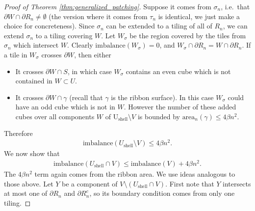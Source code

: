 \documentclass[10pt,a4paper]{amsart}
\begin{document}
\begin{proof}[Proof of Theorem \ref{thm:generalized_patching}]
     Suppose it comes from $\sigma_n$, i.e.\ that $\partial W\cap \partial R_n\neq \emptyset$ (the version where it comes from $\tau_n$ is identical, we just make a choice for concreteness). Since $\sigma_n$ can be extended to a tiling of all of $R_n$, we can extend $\sigma_n$ to a tiling covering $W$. Let $W_\sigma$ be the region covered by the tiles from $\sigma_n$ which intersect $W$. Clearly $\text{imbalance}(W_\sigma)=0$, and $W_\sigma\cap \partial R_n = W\cap \partial R_n$. If a tile in $W_\sigma$ crosses $\partial W$, then either
     \begin{itemize}
         \item It crosses $\partial W \cap S$, in which case $W_\sigma$ contains an even cube which is not contained in $W\subset U$. 
         \item It crosses $\partial W\cap \gamma$ (recall that $\gamma$ is the ribbon surface). In this case $W_\sigma$ could have an odd cube which is not in $W$. However the number of these added cubes over all components $W$ of $\text{U}_{\text{shell}}\setminus V$ is bounded by $\text{area}_n(\gamma) \leq 4\beta n^2$.
     \end{itemize}
    Therefore 
    \begin{align*}
        \text{imbalance}(U_{\text{shell}}\setminus V) \leq 4 \beta n^2. 
    \end{align*}
    We now show that 
    \begin{align*}
        \text{imbalance}(U_{\text{shell}}\cap V) \leq \text{imbalance}(V) + 4\beta n^2. 
    \end{align*}
    The $4\beta n^2$ term again comes from the ribbon area. We use ideas analogous to those above. Let $Y$ be a component of $V\setminus (U_{\text{shell}}\cap V)$. First note that $Y$ intersects at most one of $\partial R_n$ and $\partial R_n^c$, so its boundary condition comes from only one tiling. 


\end{proof}
\end{document}
